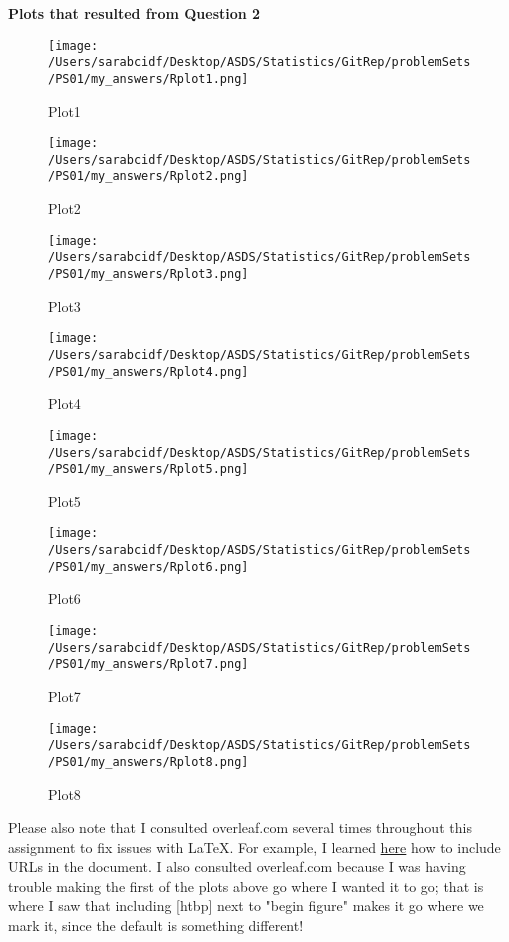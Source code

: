 \documentclass[12pt,letterpaper]{article}
\begin{document}
 \noindent \textbf {Plots that resulted from Question 2} \\
  
 
 \begin{figure}[htbp]
 \centering
 \texttt{[image: /Users/sarabcidf/Desktop/ASDS/Statistics/GitRep/problemSets/PS01/my\_answers/Rplot1.png]}
 \caption{Plot1}
 \end{figure}
 
  \begin{figure}
 \centering
 \texttt{[image: /Users/sarabcidf/Desktop/ASDS/Statistics/GitRep/problemSets/PS01/my\_answers/Rplot2.png]}
 \caption{Plot2}
 \end{figure}
 
  \begin{figure}
 \centering
 \texttt{[image: /Users/sarabcidf/Desktop/ASDS/Statistics/GitRep/problemSets/PS01/my\_answers/Rplot3.png]}
 \caption{Plot3}
 \end{figure}
 
  \begin{figure}
 \centering
 \texttt{[image: /Users/sarabcidf/Desktop/ASDS/Statistics/GitRep/problemSets/PS01/my\_answers/Rplot4.png]}
 \caption{Plot4}
 \end{figure}
 
  \begin{figure}
 \centering
 \texttt{[image: /Users/sarabcidf/Desktop/ASDS/Statistics/GitRep/problemSets/PS01/my\_answers/Rplot5.png]}
 \caption{Plot5}
 \end{figure}
 
  \begin{figure}
 \centering
 \texttt{[image: /Users/sarabcidf/Desktop/ASDS/Statistics/GitRep/problemSets/PS01/my\_answers/Rplot6.png]}
 \caption{Plot6}
 \end{figure}
 
   \begin{figure}
 	\centering
 	\texttt{[image: /Users/sarabcidf/Desktop/ASDS/Statistics/GitRep/problemSets/PS01/my\_answers/Rplot7.png]}
 	\caption{Plot7}
 \end{figure}
 
  \begin{figure}
 \centering
 \texttt{[image: /Users/sarabcidf/Desktop/ASDS/Statistics/GitRep/problemSets/PS01/my\_answers/Rplot8.png]}
 \caption{Plot8}
 \end{figure}
 
 \noindent Please also note that I consulted overleaf.com several times throughout this assignment to fix issues with LaTeX. For example, I learned \href{http://www.overleaf.com}{here} how to include URLs in the document. I also consulted overleaf.com because I was having trouble making the first of the plots above go where I wanted it to go; that is where I saw that including [htbp] next to "begin figure" makes it go where we mark it, since the default is something different! 
\end{document}
